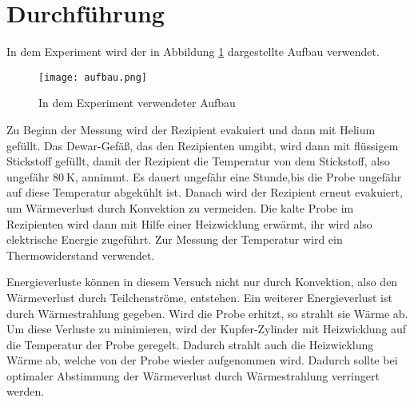 \section{Durchführung}

In dem Experiment wird der in Abbildung \ref{fig:aufbau} dargestellte Aufbau
verwendet.

\begin{figure}[H]
  \centering
  \texttt{[image: aufbau.png]}
  \caption{In dem Experiment verwendeter Aufbau \cite{skript}}
  \label{fig:aufbau}
\end{figure}

Zu Beginn der Messung wird der Rezipient evakuiert und dann mit Helium gefüllt.
Das Dewar-Gefäß, das den Rezipienten umgibt, wird dann mit flüssigem
Stickstoff gefüllt, damit der Rezipient die Temperatur von dem Stickstoff, also
ungefähr $\SI{80}{\kelvin}$, annimmt. Es dauert ungefähr eine Stunde,bis
die Probe ungefähr auf diese Temperatur abgekühlt ist. Danach wird der Rezipient erneut evakuiert,
um Wärmeverlust durch Konvektion zu vermeiden. Die kalte Probe im Rezipienten
wird dann mit Hilfe einer Heizwicklung erwärmt, ihr wird also elektrische
Energie zugeführt. Zur Messung der Temperatur wird ein Thermowiderstand verwendet.

Energieverluste können in diesem Versuch nicht nur durch Konvektion, also
den Wärmeverlust durch Teilchenströme, entstehen. Ein weiterer Energieverlust
ist durch Wärmestrahlung gegeben. Wird die Probe erhitzt, so strahlt sie
Wärme ab. Um diese Verluste zu minimieren, wird der Kupfer-Zylinder mit
Heizwicklung auf die Temperatur der Probe geregelt. Dadurch strahlt
auch die Heizwicklung Wärme ab, welche von der Probe wieder aufgenommen wird.
Dadurch sollte bei optimaler Abstimmung der Wärmeverlust durch Wärmestrahlung
verringert werden.
